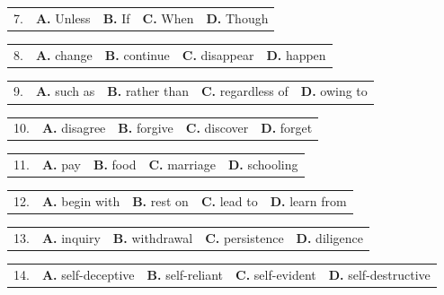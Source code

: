 \documentclass[UTF8,11pt]{ctexart}
\begin{document}
\noindent\begin{tabularx}{\linewidth}{@{}lXXXX@{}}7. & \textbf{A.} Unless & \textbf{B.} If & \textbf{C.} When & \textbf{D.} Though\\\end{tabularx}\par

\noindent\begin{tabularx}{\linewidth}{@{}lXXXX@{}}8. & \textbf{A.} change & \textbf{B.} continue & \textbf{C.} disappear & \textbf{D.} happen\\\end{tabularx}\par

\noindent\begin{tabularx}{\linewidth}{@{}lXXXX@{}}9. & \textbf{A.} such as & \textbf{B.} rather than & \textbf{C.} regardless of & \textbf{D.} owing to\\\end{tabularx}\par

\noindent\begin{tabularx}{\linewidth}{@{}lXXXX@{}}10. & \textbf{A.} disagree & \textbf{B.} forgive & \textbf{C.} discover & \textbf{D.} forget\\\end{tabularx}\par

\noindent\begin{tabularx}{\linewidth}{@{}lXXXX@{}}11. & \textbf{A.} pay & \textbf{B.} food & \textbf{C.} marriage & \textbf{D.} schooling\\\end{tabularx}\par

\noindent\begin{tabularx}{\linewidth}{@{}lXXXX@{}}12. & \textbf{A.} begin with & \textbf{B.} rest on & \textbf{C.} lead to & \textbf{D.} learn from\\\end{tabularx}\par

\noindent\begin{tabularx}{\linewidth}{@{}lXXXX@{}}13. & \textbf{A.} inquiry & \textbf{B.} withdrawal & \textbf{C.} persistence & \textbf{D.} diligence\\\end{tabularx}\par

\noindent\begin{tabularx}{\linewidth}{@{}lXXXX@{}}14. & \textbf{A.} self-deceptive & \textbf{B.} self-reliant & \textbf{C.} self-evident & \textbf{D.} self-destructive\\\end{tabularx}\par
\end{document}
